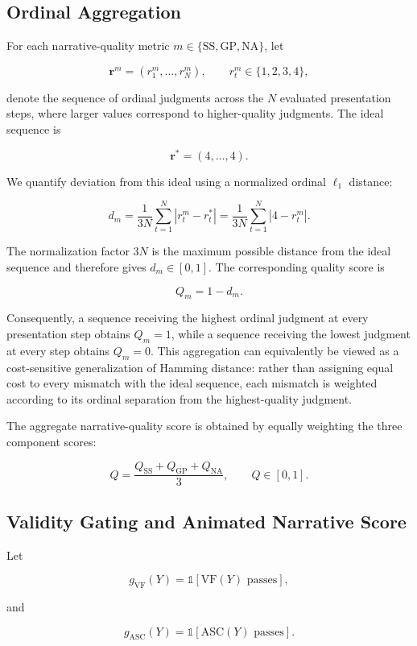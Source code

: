 \documentclass{article} %
\begin{document}
\subsection{Ordinal Aggregation}
\label{sec:supp_ordinal_aggregation}

For each narrative-quality metric
$m\in\{\mathrm{SS},\mathrm{GP},\mathrm{NA}\}$, let

\[
\mathbf{r}^{m}
=
(r_1^m,\ldots,r_N^m),
\qquad
r_t^m\in\{1,2,3,4\},
\]

denote the sequence of ordinal judgments across the $N$ evaluated
presentation steps, where larger values correspond to higher-quality
judgments. The ideal sequence is

\[
\mathbf{r}^{*}=(4,\ldots,4).
\]

We quantify deviation from this ideal using a normalized ordinal
$\ell_1$ distance:

\[
d_m
=
\frac{1}{3N}
\sum_{t=1}^{N}
\left|r_t^m-r_t^*\right|
=
\frac{1}{3N}
\sum_{t=1}^{N}
\left|4-r_t^m\right|.
\]

The normalization factor $3N$ is the maximum possible distance from the ideal
sequence and therefore gives $d_m\in[0,1]$. The corresponding quality score is

\[
Q_m = 1-d_m.
\]

Consequently, a sequence receiving the highest ordinal judgment at every
presentation step obtains $Q_m=1$, while a sequence receiving the lowest
judgment at every step obtains $Q_m=0$. This aggregation can equivalently be
viewed as a cost-sensitive generalization of Hamming distance: rather than
assigning equal cost to every mismatch with the ideal sequence, each mismatch
is weighted according to its ordinal separation from the highest-quality
judgment.

The aggregate narrative-quality score is obtained by equally weighting the
three component scores:

\[
Q
=
\frac{
Q_{\mathrm{SS}}
+
Q_{\mathrm{GP}}
+
Q_{\mathrm{NA}}
}{3},
\qquad
Q\in[0,1].
\]

\subsection{Validity Gating and Animated Narrative Score}
\label{sec:supp_gating}

Let

\[
g_{\mathrm{VF}}(Y)
=
\mathbb{1}[\mathrm{VF}(Y)\text{ passes}],
\]

and

\[
g_{\mathrm{ASC}}(Y)
=
\mathbb{1}[\mathrm{ASC}(Y)\text{ passes}].
\]
\end{document}
